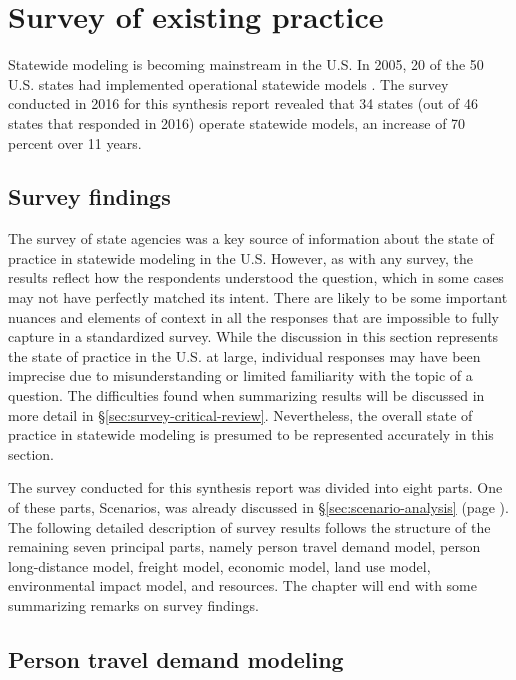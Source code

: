\chapter{Survey of existing practice}\label{sec:survey-existing-practice}


Statewide modeling is becoming
mainstream in the U.S. In 2005, 20 of the 50 U.S. states had implemented operational statewide models \citep{horowitz06}. The survey conducted in 2016 for this synthesis report revealed that 34 states (out of 46 states that responded in 2016) operate statewide models, an increase of 70 percent over 11 years.

\section{Survey findings}

The survey of state agencies was a key source of information about the state of practice in statewide modeling in the U.S. However, as with any survey, the results reflect how the respondents understood the question, which in some cases may not have perfectly matched its intent. There are likely to be some important nuances and elements of context in all the responses that are impossible to fully capture in a standardized survey. While the discussion in this section represents the state of practice in the U.S. at large, individual responses may have been imprecise due to misunderstanding or limited familiarity with the topic of a question. The difficulties found when summarizing results will be discussed in more detail in \S\ref{sec:survey-critical-review}. Nevertheless, the overall state of practice in statewide modeling is presumed to be represented accurately in this section.

The survey conducted for this synthesis report was divided into eight parts. One of these parts, Scenarios, was already discussed in \S\ref{sec:scenario-analysis} (page \pageref{sec:scenario-analysis}). The following detailed description of survey results follows the structure of the remaining seven principal parts, namely person travel demand model, person long-distance model, freight model, economic model, land use model, environmental impact model, and resources. The chapter will end with some summarizing remarks on survey findings.

\section{Person travel demand modeling}\label{sec:person-demand-modeling}

